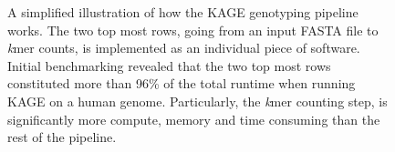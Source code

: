 \begin{figure}[H]
\begin{center}
{
}
\caption{
  A simplified illustration of how the KAGE genotyping pipeline works.
  The two top most rows, going from an input FASTA file to \textit{k}mer counts, is implemented as an individual piece of software.
  Initial benchmarking revealed that the two top most rows constituted more than 96\% of the total runtime when running KAGE on a human genome.
  Particularly, the \textit{k}mer counting step, is significantly more compute, memory and time consuming than the rest of the pipeline.
}
\label{background:kage:figures:pipeline}
\end{center}
\end{figure}
